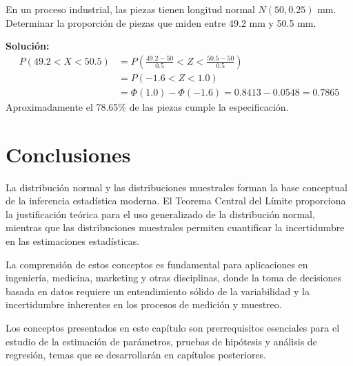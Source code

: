 \begin{example}
En un proceso industrial, las piezas tienen longitud normal $N(50, 0.25)$ mm. Determinar la proporción de piezas que miden entre 49.2 mm y 50.5 mm.

\textbf{Solución:}
\begin{align}
P(49.2 < X < 50.5) &= P\left(\frac{49.2-50}{0.5} < Z < \frac{50.5-50}{0.5}\right)\\
&= P(-1.6 < Z < 1.0)\\
&= \Phi(1.0) - \Phi(-1.6) = 0.8413 - 0.0548 = 0.7865
\end{align}
Aproximadamente el 78.65\% de las piezas cumple la especificación.
\end{example}

\section{Conclusiones}

La distribución normal y las distribuciones muestrales forman la base conceptual de la inferencia estadística moderna. El Teorema Central del Límite proporciona la justificación teórica para el uso generalizado de la distribución normal, mientras que las distribuciones muestrales permiten cuantificar la incertidumbre en las estimaciones estadísticas.

La comprensión de estos conceptos es fundamental para aplicaciones en ingeniería, medicina, marketing y otras disciplinas, donde la toma de decisiones basada en datos requiere un entendimiento sólido de la variabilidad y la incertidumbre inherentes en los procesos de medición y muestreo.

\begin{remark}
Los conceptos presentados en este capítulo son prerrequisitos esenciales para el estudio de la estimación de parámetros, pruebas de hipótesis y análisis de regresión, temas que se desarrollarán en capítulos posteriores.
\end{remark}

